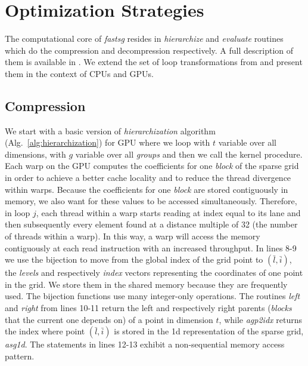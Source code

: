 \section{Optimization Strategies}
\label{sec:op_strategies}

The computational core of \textit{fastsg} resides in \textit{hierarchize} and
\textit{evaluate} routines which do the compression and decompression
respectively. A full description of them is available in
\cite{Murarasu:2011:CDS:1941553.1941559}. We extend the set of loop
transformations from \cite{murarasu12fastsg:} and present them in the context of
CPUs and GPUs. 

\subsection{Compression}

We start with a basic version of \textit{hierarchization} algorithm (Alg.~\ref{alg:hierarchization}) for GPU
where we loop with $t$ variable over all dimensions, with $g$ variable over all
\textit{groups} and then we call the kernel procedure. Each warp on the GPU
computes the coefficients for one \textit{block} of the sparse grid in order to
achieve a better cache locality and to reduce the thread divergence within
warps. Because the coefficients for one \textit{block} are stored contiguously
in memory, we also want for these values to be accessed simultaneously.
Therefore, in loop $j$, each thread within a warp starts reading at index equal
to its lane and then subsequently every element found at a distance multiple of 32 (the
number of threads within a warp). In this way, a warp will access the memory
contiguously at each read instruction with an increased throughput. In lines
8-9 we use the bijection to move from the global index of the grid point to
$(\bar{l}, \bar{i})$, the \textit{levels} and respectively \textit{index}
vectors representing the coordinates of one point in the grid. We store them in the
shared memory because they are frequently used. The bijection functions use many
integer-only operations. The routines \textit{left} and \textit{right}
from lines 10-11 return the left and respectively right parents (\textit{blocks}
that the current one depends on) of a point in dimension $t$, while
\textit{agp2idx} returns the index where point $(\bar{l}, \bar{i})$ is stored in
the 1d representation of the sparse grid, \textit{asg1d}. The statements in
lines 12-13 exhibit a non-sequential memory access pattern.

